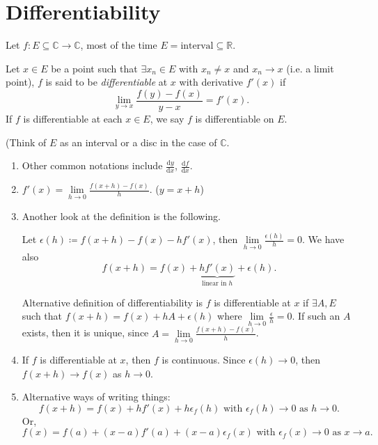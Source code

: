 \section{Differentiability}
Let \(f: E \subseteq \mathbb{C} \to \mathbb{C}\), most of the time \(E = \text{interval} \subseteq \mathbb{R}\).
\begin{definition}
    Let \(x \in E\) be a point such that \(\exists x_n \in E\) with \(x_n \neq x\) and \(x_n \to x\) (i.e. a limit point), \(f\) is said to be \textit{differentiable}  at \(x\) with derivative \(f'(x)\) if
    \[
        \lim\limits_{y \to x} \frac{f(y) - f(x)}{y - x} = f'(x).
    \]
    If \(f\) is differentiable at each \(x \in E\), we say \(f\) is differentiable on \(E\).

    (Think of \(E\) as an interval or a disc in the case of \(\mathbb{C}\).
\end{definition}
\begin{remark}
    \leavevmode
    \begin{enumerate}
        \item Other common notations include \(\frac{\mathrm{d}y}{\mathrm{d}x}\), \(\frac{\mathrm{d}f}{\mathrm{d}x} \).
        \item \(f'(x) = \lim\limits_{h \to 0} \frac{f(x+h)-f(x)}{h}\). (\(y=x+h\))
        \item Another look at the definition is the following.
        
        Let \(\epsilon(h) \coloneqq f(x + h) - f(x) - hf'(x)\), then \(\lim\limits_{h \to 0} \frac{\epsilon(h)}{h}=0\). We have also
        \[
            f(x+h) = f(x) + \underbrace{hf'(x)}_{\text{linear in }h} + \epsilon(h).
        \]

        Alternative definition of differentiability is \(f\) is differentiable at \(x\) if \(\exists A, E\) such that \(f(x + h) = f(x) + hA + \epsilon(h)\) where \(\lim\limits_{h \to 0} \frac{\epsilon}{h}=0\). If such an \(A\) exists, then it is unique, since \(A = \lim\limits_{h \to 0} \frac{f(x+h) - f(x)}{h}\).
        \item If \(f\) is differentiable at \(x\), then \(f\) is continuous. Since \(\epsilon(h) \to 0\), then \(f(x + h) \to f(x)\) as \(h \to 0\).
        \item Alternative ways of writing things:
        \[
            f(x + h) = f(x) + hf'(x) + h\epsilon_f(h) \text{ with } \epsilon_f(h) \to 0 \text{ as } h\to 0.
        \]
        Or,
        \[
            f(x) = f(a) + (x-a)f'(a) + (x-a)\epsilon_f(x) \text{ with } \epsilon_f(x) \to 0 \text{ as } x\to a.
        \]
    \end{enumerate}
\end{remark}
